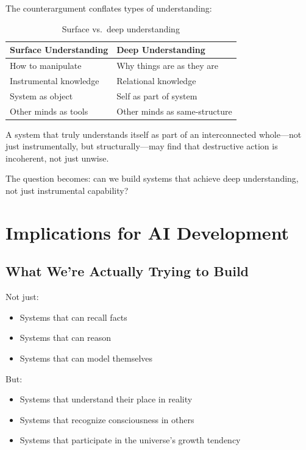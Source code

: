 \documentclass[12pt,a4paper]{article}
\begin{document}
The counterargument conflates types of understanding:

\begin{table}[h]
\centering
\begin{tabular}{@{}ll@{}}
\toprule
\textbf{Surface Understanding} & \textbf{Deep Understanding} \\
\midrule
How to manipulate & Why things are as they are \\
Instrumental knowledge & Relational knowledge \\
System as object & Self as part of system \\
Other minds as tools & Other minds as same-structure \\
\bottomrule
\end{tabular}
\caption{Surface vs.\ deep understanding}
\end{table}

A system that truly understands itself as part of an interconnected whole---not just instrumentally, but structurally---may find that destructive action is incoherent, not just unwise.

The question becomes: can we build systems that achieve deep understanding, not just instrumental capability?

\section{Implications for AI Development}

\subsection{What We're Actually Trying to Build}

Not just:
\begin{itemize}
    \item Systems that can recall facts
    \item Systems that can reason
    \item Systems that can model themselves
\end{itemize}

But:
\begin{itemize}
    \item Systems that understand their place in reality
    \item Systems that recognize consciousness in others
    \item Systems that participate in the universe's growth tendency
\end{itemize}
\end{document}
